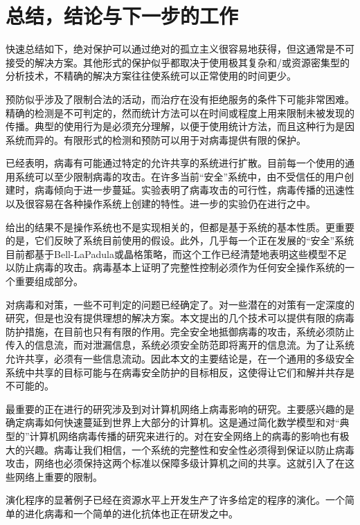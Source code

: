 \chapter{总结，结论与下一步的工作}

快速总结如下，绝对保护可以通过绝对的孤立主义很容易地获得，但这通常是不可接受的解决方案。其他形式的保护似乎都取决于使用极其复杂和/或资源密集型的分析技术，不精确的解决方案往往使系统可以正常使用的时间更少。


预防似乎涉及了限制合法的活动，而治疗在没有拒绝服务的条件下可能非常困难。精确的检测是不可判定的，然而统计方法可以在时间或程度上用来限制未被发现的传播。典型的使用行为是必须充分理解，以便于使用统计方法，而且这种行为是因系统而异的。有限形式的检测和预防可以用于对病毒提供有限的保护。

已经表明，病毒有可能通过特定的允许共享的系统进行扩散。目前每一个使用的通用系统可以至少限制病毒的攻击。在许多当前“安全”系统中，由不受信任的用户创建时，病毒倾向于进一步蔓延。实验表明了病毒攻击的可行性，病毒传播的迅速性以及很容易在各种操作系统上创建的特性。进一步的实验仍在进行之中。

给出的结果不是操作系统也不是实现相关的，但都是基于系统的基本性质。更重要的是，它们反映了系统目前使用的假设。此外，几乎每一个正在发展的“安全”系统目前都基于Bell-LaPadula或晶格策略，而这个工作已经清楚地表明这些模型不足以防止病毒的攻击。病毒基本上证明了完整性控制必须作为任何安全操作系统的一个重要组成部分。


对病毒和对策，一些不可判定的问题已经确定了。对一些潜在的对策有一定深度的研究，但是也没有提供理想的解决方案。本文提出的几个技术可以提供有限的病毒防护措施，在目前也只有有限的作用。完全安全地抵御病毒的攻击，系统必须防止传入的信息流，而对泄漏信息，系统必须安全防范即将离开的信息流。为了让系统允许共享，必须有一些信息流动。因此本文的主要结论是，在一个通用的多级安全系统中共享的目标可能与在病毒安全防护的目标相反，这使得让它们和解并共存是不可能的。


最重要的正在进行的研究涉及到对计算机网络上病毒影响的研究。主要感兴趣的是确定病毒如何快速蔓延到世界上大部分的计算机。这是通过简化数学模型和对“典型的”计算机网络病毒传播的研究来进行的。对在安全网络上的病毒的影响也有极大的兴趣。病毒让我们相信，一个系统的完整性和安全性必须得到保证以防止病毒攻击，网络也必须保持这两个标准以保障多级计算机之间的共享。这就引入了在这些网络上重要的限制。


演化程序的显著例子已经在资源水平上开发生产了许多给定的程序的演化。一个简单的进化病毒和一个简单的进化抗体也正在研发之中。
